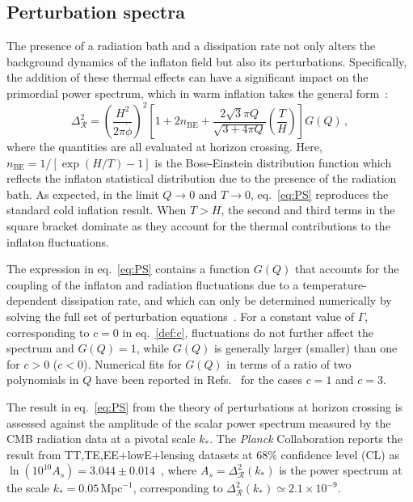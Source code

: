 \documentclass[a4paper,11pt]{article}
\begin{document}
\subsection{Perturbation spectra}

The presence of a radiation bath and a dissipation rate not only alters the background dynamics of the inflaton field but also its perturbations. Specifically, the addition of these thermal effects can have a significant impact on the primordial power spectrum, which in warm inflation takes the general form~\cite{Hall:2003zp, Graham:2009bf, Bastero-Gil:2011rva, Ramos:2013nsa}:
\begin{equation}
    \label{eq:PS}
    \Delta_{\mathcal{R}}^{2}=\left(\frac{H^{2}}{2 \pi \dot{\phi}}\right)^{2}\left[1+2 n_{\mathrm{BE}}+\frac{2 \sqrt{3} \pi Q}{\sqrt{3+4 \pi Q}} \left(\frac{T}{H}\right)\right] G(Q)\,,
\end{equation}
where the quantities are all evaluated at horizon crossing. Here, $n_{\mathrm{BE}} =1/\left[\exp(H/T)-1\right]$ is the Bose-Einstein distribution function which reflects the inflaton statistical distribution due to the presence of the radiation bath. As expected, in the limit $Q \to 0$ and $T \to 0$, eq.~\eqref{eq:PS} reproduces the standard cold inflation result. When $T>H$, the second and third terms in the square bracket dominate as they account for the thermal contributions to the inflaton fluctuations.

The expression in eq.~\eqref{eq:PS} contains a function $G(Q)$ that accounts for the coupling of the inflaton and radiation fluctuations due to a temperature-dependent dissipation rate, and which can only be determined numerically by solving the full set of perturbation equations~\cite{Graham:2009bf, Bastero-Gil:2011rva}. For a constant value of $\Gamma$, corresponding to $c=0$ in eq.~\eqref{def:c}, fluctuations do not further affect the spectrum and $G(Q) = 1$, while $G(Q)$ is generally larger (smaller) than one for $c >0$ ($c<0$). Numerical fits for $G(Q)$ in terms of a ratio of two polynomials in $Q$ have been reported in Refs.~\cite{Bastero-Gil:2016qru, Benetti:2016jhf} for the cases $c = 1$ and $c=3$.

The result in eq.~\eqref{eq:PS} from the theory of perturbations at horizon crossing is assessed against the amplitude of the scalar power spectrum measured by the CMB radiation data at a pivotal scale $k_*$. The \textit{Planck} Collaboration reports the result from TT,TE,EE+lowE+lensing datasets at 68\% confidence level (CL) as $\ln(10^{10}A_s) = 3.044\pm 0.014$~\cite{Planck:2018vyg}, where $A_s = \Delta_{\mathcal{R}}^2(k_{*})$ is the power spectrum at the scale $k_{*} = 0.05\,\mathrm{Mpc}^{-1}$, corresponding to $\Delta_{\mathcal{R}}^2(k_{*}) \simeq 2.1 \times 10^{-9}$.
\end{document}
